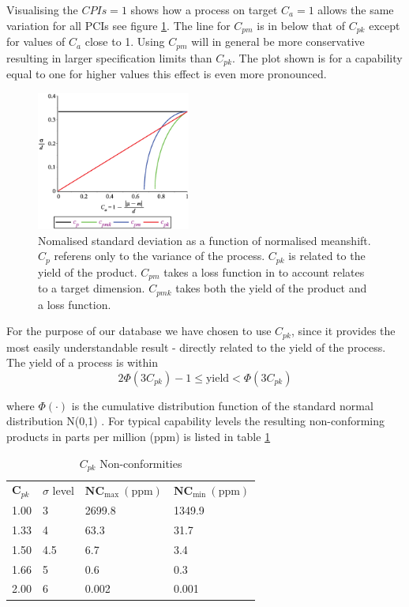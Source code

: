 \documentclass[aip,amsmath, reprint, author-year]{revtex4-1}
\begin{document}
Visualising the $CPIs = 1$  shows how a process on target $C_a = 1$ allows the same variation for all PCIs see figure \ref{fig:CPI}. The line for $C_{pm}$ is in below that of $C_{pk}$ except for values of $C_a$ close to 1. 
Using $C_{pm}$ will in general be more conservative resulting in larger specification limits than $C_{pk}$. The plot shown is for a capability equal to one for higher values this effect is even more pronounced.

\begin{figure}
\includegraphics[width=0.45\textwidth]{graph_postscript_test.eps}
\caption{\label{fig:CPI} Nomalised standard deviation as a function of normalised meanshift. $C_p$ referens only to the variance of the process. $C_{pk}$ is related to the yield of the product. $C_{pm}$ takes a loss function in to account relates to a target dimension. $C_{pmk}$ takes both the yield of the product and a loss function. }
\end{figure}

For the purpose of our database we have chosen to use $C_{pk}$, since it provides the most easily understandable result - directly related to the yield of the process. The yield of a process is within
\begin{equation}
	2\Phi(3C_{pk})-1 \leq \text{yield} < \Phi(3C_{pk}) \nonumber
\end{equation}

where $\Phi(\cdot)$ is the cumulative distribution function of the standard normal distribution N(0,1) \citep{boyles1991taguchi}. For typical capability levels the resulting non-conforming products in parts per million (ppm) is listed in table \ref{tab:cpl_nc}

\begin{table}
\begin{ruledtabular}
\caption{\label{tab:cpl_nc} $C_{pk}$ Non-conformities}
\begin{tabular}{llll}
  $\mathbf{C}_{pk}$	& $\sigma$ level	& $\mathbf{NC_\mathrm{max}} \mathrm{\ (ppm)}$	&  $\mathbf{NC_\mathrm{min}} \mathrm{\ (ppm)}$	\\
  1.00	& 3		& 2699.8		& 1349.9		\\
  1.33 	& 4 		& 63.3		& 31.7 		\\
  1.50 	& 4.5 	& 6.7		& 3.4		\\
  1.66	& 5		& 0.6		& 0.3		\\
  2.00	& 6		& 0.002		& 0.001		\\
\end{tabular}%
\end{ruledtabular}
\end{table}
\end{document}
